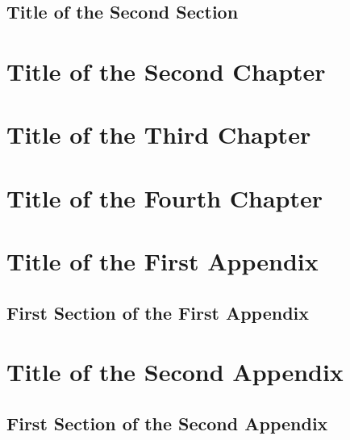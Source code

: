 \documentclass[a4paper,12pt,twoside]{report}
\begin{document}
\section{Title of the Second Section}

\chapter{Title of the Second Chapter}
\thispagestyle{empty}

\chapter{Title of the Third Chapter}
\thispagestyle{empty}

\chapter{Title of the Fourth Chapter}
\thispagestyle{empty}

\printglossary[title=Glossary]




\appendix
\appendixpage
\addappheadtotoc
\chapter{Title of the First Appendix}
\section{First Section of the First Appendix}

\chapter{Title of the Second Appendix}
\section{First Section of the Second Appendix}

\printindex
\end{document}

